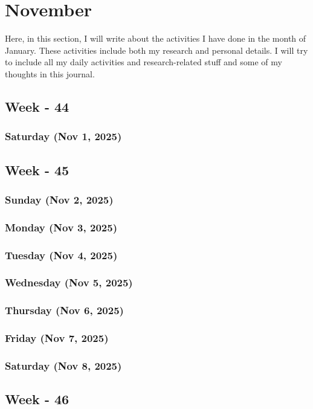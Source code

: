 \chapter{November}
\label{chap:November}
\hspace{1cm}
Here, in this section, I will write about the activities \cite{zhou2015} I have done in the month of January. These activities include both my research and personal details. I will try to include all my daily activities and research-related stuff and some of my thoughts in this journal.

\section{Week - 44}
\subsection*{Saturday (Nov 1, 2025)}

\section{Week - 45}
\subsection*{Sunday (Nov 2, 2025)}
\subsection*{Monday (Nov 3, 2025)}
\subsection*{Tuesday (Nov 4, 2025)}
\subsection*{Wednesday (Nov 5, 2025)}
\subsection*{Thursday (Nov 6, 2025)}
\subsection*{Friday (Nov 7, 2025)}
\subsection*{Saturday (Nov 8, 2025)}

\section{Week - 46}
